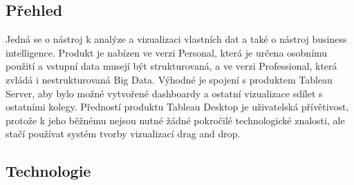 \documentclass[czech,BP]{thesiskiv2}
\begin{document}
 \subsection{Přehled}
 Jedná se o nástroj k analýze a vizualizaci vlastních dat a také o nástroj business intelligence. Produkt je nabízen ve verzi Personal, která je určena osobnímu použití a vstupní data musejí být strukturovaná, a ve verzi Professional, která zvládá i nestrukturovaná Big Data. Výhodné je spojení s produktem Tableau Server, aby bylo možné vytvořené dashboardy a ostatní vizualizace sdílet s ostatními kolegy. Předností produktu Tableau Desktop je uživatelská přívětivost, protože k jeho běžnému nejsou nutné žádné pokročilé technologické znalosti, ale stačí používat systém tvorby vizualizací drag and drop. 
 
 \subsection{Technologie}
 
\end{document}
